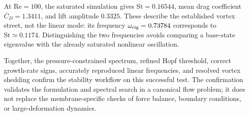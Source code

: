 At $\mathrm{Re}=100$, the saturated simulation gives $\mathrm{St}=0.16544$, mean drag coefficient $\overline C_D=1.3411$, and lift amplitude $0.3325$. These describe the established vortex street, not the linear mode: its frequency $\omega_{\rm eig}=0.73784$ corresponds to $\mathrm{St}\simeq0.1174$. Distinguishing the two frequencies avoids comparing a base-state eigenvalue with the already saturated nonlinear oscillation.

Together, the pressure-constrained spectrum, refined Hopf threshold, correct growth-rate signs, accurately reproduced linear frequencies, and resolved vortex shedding confirm the stability workflow on this successful test. The confirmation validates the formulation and spectral search in a canonical flow problem; it does not replace the membrane-specific checks of force balance, boundary conditions, or large-deformation dynamics.
